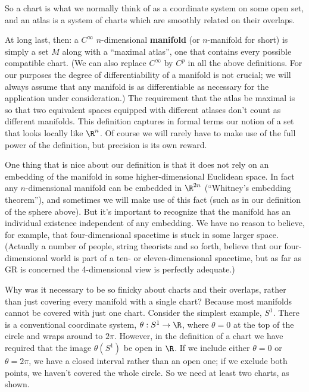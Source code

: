 \begin{figure}[h]
  \centerline{
  }
\end{figure}

\noindent So a chart is what we normally think of as a coordinate system on
some open set, and an atlas is a system of charts which are smoothly
related on their overlaps.

At long last, then: a $C^\infty$ $n$-dimensional {\bf manifold} (or 
$n$-manifold for short) is simply a set $M$ along with a ``maximal atlas'',
one that contains every possible compatible chart.  (We can also replace 
$C^\infty$ by $C^p$ in all the above definitions.  For our purposes the degree
of differentiability of a manifold is not crucial; we will always assume
that any manifold is as differentiable as necessary for the application
under consideration.)  The requirement that the 
atlas be maximal is so that two equivalent spaces equipped with
different atlases don't count as different manifolds.
This definition captures in
formal terms our notion of a set that looks locally like $\R^n$.
Of course we will rarely have to make use of the full power of the
definition, but precision is its own reward.  

One thing that is nice about our definition is that it does not rely
on an embedding of the manifold in some higher-dimensional Euclidean
space.  In fact any $n$-dimensional manifold can be embedded in
$\R^{2n}$ (``Whitney's embedding theorem''), 
and sometimes we will make use of this fact (such as
in our definition of the sphere above).  But it's important to 
recognize that the manifold has an individual existence independent
of any embedding.  We have no reason to believe, for example, that
four-dimensional spacetime is stuck in some larger space.  (Actually
a number of people, string theorists and so forth, believe that our
four-dimensional world is part of a ten- or eleven-dimensional
spacetime, but as far as GR
is concerned the 4-dimensional view is perfectly adequate.)

Why was it necessary to be so finicky about charts and their overlaps,
rather than just covering every manifold with a single chart?  Because
most manifolds cannot be covered with just one chart.  Consider the
simplest example, $S^1$.  There is a conventional coordinate system,
$\theta: S^1\rightarrow\R$, where $\theta=0$ at the top of the circle
and wraps around to $2\pi$.  However, in the definition of a chart we
have required that the image $\theta(S^1)$ be open in $\R$.  If we 
include either $\theta=0$ or $\theta=2\pi$, we have a closed interval
rather than an open one; if we exclude both points, we haven't covered
the whole circle.  So we need at least two charts, as shown.

